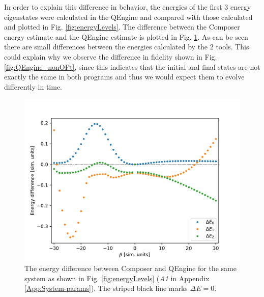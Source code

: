 \documentclass[a4paper, twocolumn]{revtex4-1}
\begin{document}
In order to explain this difference in behavior, the energies of the first 3 energy eigenstates were calculated in the QEngine and compared with those calculated and plotted in Fig. \ref{fig:energyLevels}. The difference between the Composer energy estimate and the QEngine estimate is plotted in Fig. \ref{fig:QEngine_energydiff}. As can be seen there are small differences between the energies calculated by the 2 tools. This could explain why we observe the difference in fidelity shown in Fig. \ref{fig:QEngine_nonOPt}, since this indicates that the initial and final states are not exactly the same in both programs and thus we would expect them to evolve differently in time.\\

\begin{figure}
	\includegraphics[width=\columnwidth]{graphics/stateAnalysis/energyDiffQEngineComp.pdf}
	\caption{The energy difference between Composer and QEngine for the same system as shown in Fig. \ref{fig:energyLevels} (\textit{A1} in Appendix \ref{App:System-params}). The striped black line marks $\Delta E=0$.}
	\label{fig:QEngine_energydiff}
\end{figure}
\end{document}
